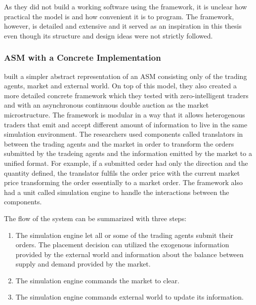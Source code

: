 
As they did not build a working software using the framework, it is unclear
how practical the model is and how convenient it is to program. The framework, 
however, is detailed and extensive and it served as an inspiration in this thesis even though
its structure and design ideas were not strictly followed.


\subsubsection{ASM with a Concrete Implementation}
\citet{Julien07} built a simpler abstract representation of an ASM consisting
only of the trading agents, market and external world. On top of this model, 
they also created a more detailed concrete framework which they tested with
zero-intelligent traders and with an asynchronous continuous double auction as the market
microstructure. The framework is modular in a way that it allows heterogenous traders
that emit and accept different amount of information to live in the same 
simulation environment. The researchers used components called translators in between the 
trading agents and the market in order to transform the orders submitted by
the tradeing agents and the information emitted by the market to a unified format.
For example, if a submitted order had only the direction and the quantity 
defined, the translator fulfils the order price with the current market price 
transforming the order essentially to a market order. The framework also had a
unit called simulation engine to handle the interactions between the components.

The flow of the system can be summarized with three steps:
\begin{enumerate}
    \item The simulation engine let all or some of the trading agents submit their orders. 
            The placement decision can utilized the exogenous information provided by the 
            external world and information about the balance between supply and demand 
            provided by the market.
    \item The simulation engine commands the market to clear.
    \item The simulation engine commands external world to update its information.
\end{enumerate}


